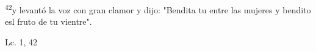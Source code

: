 \documentclass[../../rosario.tex]{subfiles}
\begin{document}
    \textsuperscript{42}y levantó la voz con gran clamor y dijo: "Bendita tu entre las mujeres y bendito esl fruto de tu vientre".
    \begin{flushright}
    Lc. 1, 42         
    \end{flushright}
\end{document}
